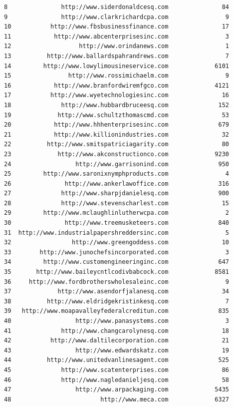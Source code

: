 \documentclass[
  12pt,
]{article}
\begin{document}
\begin{verbatim}
8               http://www.siderdonaldcesq.com               84
9               http://www.clarkrichardcpa.com                9
10           http://www.fbsbusinessfinance.com               17
11            http://www.abcenterprisesinc.com                3
12                   http://www.orindanews.com                1
13          http://www.ballardspahrandrews.com                7
14         http://www.lowylimousineservice.com             6101
15                http://www.rossimichaelm.com                9
16            http://www.branfordwiremfgco.com             4121
17           http://www.wyetechnologiesinc.com               16
18              http://www.hubbardbruceesq.com              152
19             http://www.schultzthomascmd.com               53
20            http://www.hhhenterprisesinc.com              679
21            http://www.killionindustries.com               32
22          http://www.smitspatriciagarity.com               80
23             http://www.akconstructionco.com             9230
24                  http://www.garrisonind.com              950
25         http://www.saronixnymphproducts.com                4
26               http://www.ankerlawoffice.com              316
27              http://www.sharpjdanielesq.com              900
28              http://www.stevenscharlest.com               15
29         http://www.mclaughlinlutherwcpa.com                2
30               http://www.treemusketeers.com              840
31  http://www.industrialpapershreddersinc.com                5
32                 http://www.greengoddess.com               10
33        http://www.junochefsincorporated.com                3
34         http://www.customengineeringinc.com              647
35       http://www.baileycntlcodivbabcock.com             8581
36     http://www.fordbrotherswholesaleinc.com                9
37             http://www.asendorfjalanesq.com               34
38          http://www.eldridgekristinkesq.com                7
39   http://www.moapavalleyfederalcreditun.com              835
40                  http://www.panasystems.com                3
41              http://www.changcarolynesq.com               18
42           http://www.daltilecorporation.com               21
43                  http://www.edwardskatz.com               19
44          http://www.unitedvanlinesagent.com              525
45              http://www.scatenterprises.com               86
46              http://www.nagledanieljesq.com               58
47                  http://www.arpackaging.com             5435
48                         http://www.meca.com             6327

\end{verbatim}
\end{document}
